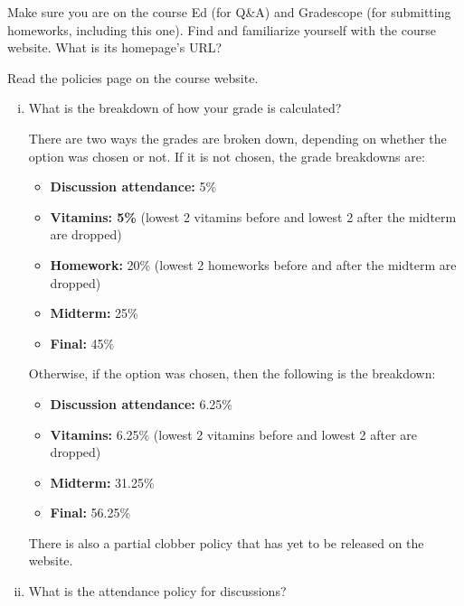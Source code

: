 \documentclass[11pt]{article}
\begin{document}
\begin{Parts}

\Part Make sure you are on the course Ed (for Q\&A) and Gradescope (for submitting homeworks, including this one). Find and familiarize yourself with the course website. What is its homepage's URL?

\Part Read the policies page on the course website.
	\begin{enumerate}[(i)]  
		\item What is the breakdown of how your grade is calculated? \\
		\begin{solution}
        There are two ways the grades are broken down, depending on whether the  option was chosen or not. If it is not chosen, the grade breakdowns are:

        \begin{itemize}
          \item \textbf{Discussion attendance:} 5\%
          \item \textbf{Vitamins: 5\%} (lowest 2 vitamins before and lowest 2 after the midterm are dropped)
          \item \textbf{Homework:} 20\% (lowest 2 homeworks before and after the midterm are dropped)
          \item \textbf{Midterm:} 25\%
          \item \textbf{Final:} 45\% 
        \end{itemize}

        Otherwise, if the  option was chosen, then the following is the breakdown:

        \begin{itemize}
          \item \textbf{Discussion attendance:} 6.25\%
          \item \textbf{Vitamins:} 6.25\% (lowest 2 vitamins before and lowest 2 after are dropped)
          \item \textbf{Midterm:} 31.25\%
          \item \textbf{Final:} 56.25\%
        \end{itemize}

        There is also a partial clobber policy that has yet to be released on the website.

    \end{solution}
		\item What is the attendance policy for discussions?
		

\end{enumerate}
\end{Parts}
\end{document}
